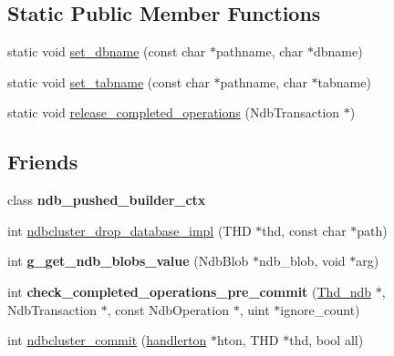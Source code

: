 \subsection*{Static Public Member Functions}
\begin{DoxyCompactItemize}
\item 
static void \mbox{\hyperlink{classha__ndbcluster_a1a9f8c543b010643808df803f7db9e1b}{set\+\_\+dbname}} (const char $\ast$pathname, char $\ast$dbname)
\item 
static void \mbox{\hyperlink{classha__ndbcluster_a3432f398baec4d4ebc0b02af534bd860}{set\+\_\+tabname}} (const char $\ast$pathname, char $\ast$tabname)
\item 
static void \mbox{\hyperlink{classha__ndbcluster_a58176e049237d75781412ad1e75e4d0f}{release\+\_\+completed\+\_\+operations}} (Ndb\+Transaction $\ast$)
\end{DoxyCompactItemize}
\subsection*{Friends}
\begin{DoxyCompactItemize}
\item 
\mbox{\label{classha__ndbcluster_a83f7116a2471d8f8ea1c29ef9f66d01f}} 
class {\bfseries ndb\+\_\+pushed\+\_\+builder\+\_\+ctx}
\item 
int \mbox{\hyperlink{classha__ndbcluster_a81d2867500d8a5c574e4e22d1b407d80}{ndbcluster\+\_\+drop\+\_\+database\+\_\+impl}} (T\+HD $\ast$thd, const char $\ast$path)
\item 
\mbox{\label{classha__ndbcluster_abacd62dc79483d9590e2250286e714e4}} 
int {\bfseries g\+\_\+get\+\_\+ndb\+\_\+blobs\+\_\+value} (Ndb\+Blob $\ast$ndb\+\_\+blob, void $\ast$arg)
\item 
\mbox{\label{classha__ndbcluster_a98eb7dd1da4f4878ea3f774df43fcb20}} 
int {\bfseries check\+\_\+completed\+\_\+operations\+\_\+pre\+\_\+commit} (\mbox{\hyperlink{classThd__ndb}{Thd\+\_\+ndb}} $\ast$, Ndb\+Transaction $\ast$, const Ndb\+Operation $\ast$, uint $\ast$ignore\+\_\+count)
\item 
int \mbox{\hyperlink{classha__ndbcluster_ae2bd9470fe7beb5dc3481654718f39b7}{ndbcluster\+\_\+commit}} (\mbox{\hyperlink{structhandlerton}{handlerton}} $\ast$hton, T\+HD $\ast$thd, bool all)
\end{DoxyCompactItemize}
